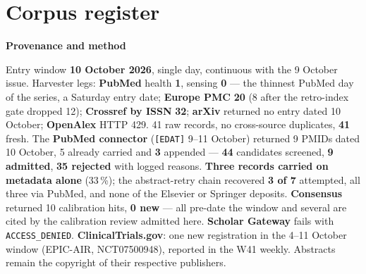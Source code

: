 \documentclass[10pt]{article}
\begin{document}
\clearpage
\section*{\sffamily\bfseries\color{Deep}Corpus register}
\vspace{-1.5mm}{\color{Amber}\rule{\linewidth}{1.1pt}}\vspace{2.5mm}



\vspace{2mm}

\begin{keybox}
{\sffamily\bfseries\footnotesize\color{Deep}Provenance and method}\\[1.2mm]
{\fontsize{7.2}{8.8}\selectfont
Entry window \textbf{10 October 2026}, single day, continuous with the 9 October issue.
Harvester legs: \textbf{PubMed} health \textbf{1}, sensing \textbf{0} --- the thinnest PubMed day of the
series, a Saturday entry date; \textbf{Europe PMC} \textbf{20} (8 after the retro-index gate dropped 12);
\textbf{Crossref by ISSN} \textbf{32}; \textbf{arXiv} returned no entry dated 10 October;
\textbf{OpenAlex} HTTP 429. 41 raw records, no cross-source duplicates, \textbf{41} fresh. The
\textbf{PubMed connector} (\texttt{[EDAT]} 9--11 October) returned 9 PMIDs dated 10 October, 5 already
carried and \textbf{3} appended --- \textbf{44} candidates screened, \textbf{9 admitted}, \textbf{35
rejected} with logged reasons. \textbf{Three records carried on metadata alone} (33\,\%); the
abstract-retry chain recovered \textbf{3 of 7} attempted, all three via PubMed, and none of the Elsevier
or Springer deposits. \textbf{Consensus} returned 10 calibration hits, \textbf{0 new} --- all pre-date the
window and several are cited by the calibration review admitted here. \textbf{Scholar Gateway} fails with
\texttt{ACCESS\_DENIED}. \textbf{ClinicalTrials.gov}: one new registration in the 4--11 October window
(EPIC-AIR, NCT07500948), reported in the W41 weekly. Abstracts remain the copyright of their respective
publishers.\par}
\end{keybox}
\end{document}
